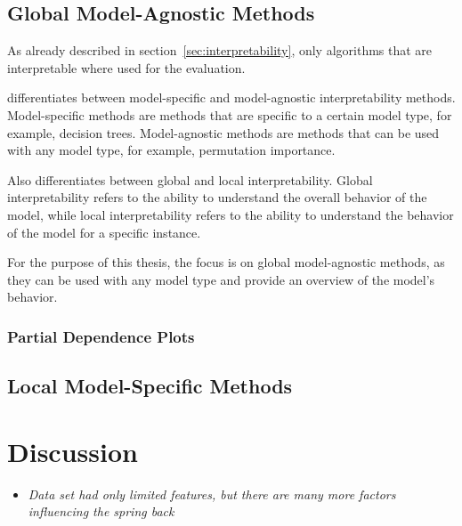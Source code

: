 \subsection*{Global Model-Agnostic Methods}
As already described in section~\ref{sec:interpretability}, only algorithms
that are
interpretable where used for the evaluation.

\cite{molnar2020interpretable} differentiates between
model-specific and model-agnostic interpretability methods.
Model-specific methods are methods that are specific to a certain model type, for example,
decision trees.
Model-agnostic methods are methods that can be used with any model type, for
example, permutation importance.

Also \cite{molnar2020interpretable} differentiates between global and local
interpretability. Global
interpretability refers to the ability to understand the overall behavior of
the model, while
local interpretability refers to the ability to understand the behavior of
the model for a
specific instance.

For the purpose of this thesis, the focus is on global model-agnostic
methods, as they can be used
with any model type and provide an overview of the model's behavior.

\subsubsection*{Partial Dependence Plots}

\subsection{Local Model-Specific
Methods}\label{subsec:local-model-specific-methods}

\section[]{Discussion}\label{sec:discussion}


\begin{itemize}
    \item \textit{Data set had only limited features, but there are many more factors
    influencing
    the spring back}
\end{itemize}

